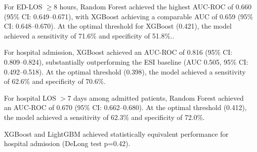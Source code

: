 \documentclass[harvard,article]{frontiersinFPHY_FAMS}
\begin{document}
For ED-LOS $\geq$8 hours, Random Forest achieved the highest AUC-ROC of 0.660 (95\% CI: 0.649--0.671), with XGBoost achieving a comparable AUC of 0.659 (95\% CI: 0.648--0.670). At the optimal threshold for XGBoost (0.421), the model achieved a sensitivity of 71.6\% and specificity of 51.8\%..

For hospital admission, XGBoost achieved an AUC-ROC of 0.816 (95\% CI: 0.809--0.824), substantially outperforming the ESI baseline (AUC 0.505, 95\% CI: 0.492--0.518). At the optimal threshold (0.398), the model achieved a sensitivity of 62.6\% and specificity of 70.6\%.

For hospital LOS $>$7 days among admitted patients, Random Forest achieved an AUC-ROC of 0.670 (95\% CI: 0.662--0.680). At the optimal threshold (0.412), the model achieved a sensitivity of 62.3\% and specificity of 72.0\%.

XGBoost and LightGBM achieved statistically equivalent performance for hospital admission (DeLong test p=0.42).
\end{document}
